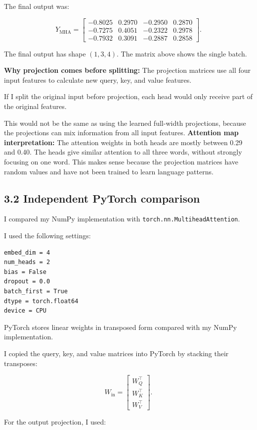 \documentclass[11pt]{article}
\begin{document}
The final output was:

\[
Y_{\mathrm{MHA}}=
\begin{bmatrix}
-0.8025&0.2970&-0.2950&0.2870\\
-0.7275&0.4051&-0.2322&0.2978\\
-0.7932&0.3091&-0.2887&0.2858
\end{bmatrix}.
\]

The final output has shape $(1,3,4)$.
The matrix above shows the single batch.

\textbf{Why projection comes before splitting:} The projection matrices use all four input
features to calculate new query, key, and
value features.

If I split the original input before projection,
each head would only receive part of the
original features.

This would not be the same as using the learned
full-width projections, because the projections
can mix information from all input features.
\textbf{Attention map interpretation:} The attention weights in both heads are mostly
between 0.29 and 0.40. The heads give similar
attention to all three words, without strongly
focusing on one word. This makes sense because the projection matrices
have random values and have not been trained
to learn language patterns.
\subsection*{3.2 Independent PyTorch comparison}
I compared my NumPy implementation with
\texttt{torch.nn.MultiheadAttention}.

I used the following settings:

\begin{verbatim}
embed_dim = 4
num_heads = 2
bias = False
dropout = 0.0
batch_first = True
dtype = torch.float64
device = CPU
\end{verbatim}

PyTorch stores linear weights in transposed form
compared with my NumPy implementation.

I copied the query, key, and value matrices
into PyTorch by stacking their transposes:

\[
W_{\mathrm{in}}=
\begin{bmatrix}
W_Q^\top\\
W_K^\top\\
W_V^\top
\end{bmatrix}.
\]

For the output projection, I used:
\end{document}
